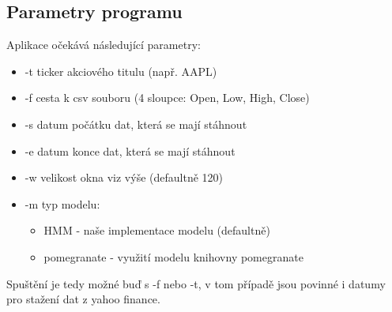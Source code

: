 \subsection{Parametry programu}
Aplikace očekává následující parametry:
\begin{itemize}
    \item -t ticker akciového titulu (např. AAPL)
    \item -f cesta k csv souboru (4 sloupce: Open, Low, High, Close)
    \item -s datum počátku dat, která se mají stáhnout
    \item -e datum konce dat, která se mají stáhnout
    \item -w velikost okna viz výše (defaultně 120)
    \item -m typ modelu:
    \begin{itemize}
        \item HMM - naše implementace modelu (defaultně)
        \item pomegranate - využití modelu knihovny pomegranate
    \end{itemize}
\end{itemize}
Spuštění je tedy možné buď s -f nebo -t, v tom případě jsou povinné i datumy pro stažení dat z yahoo finance.

\clearpage
